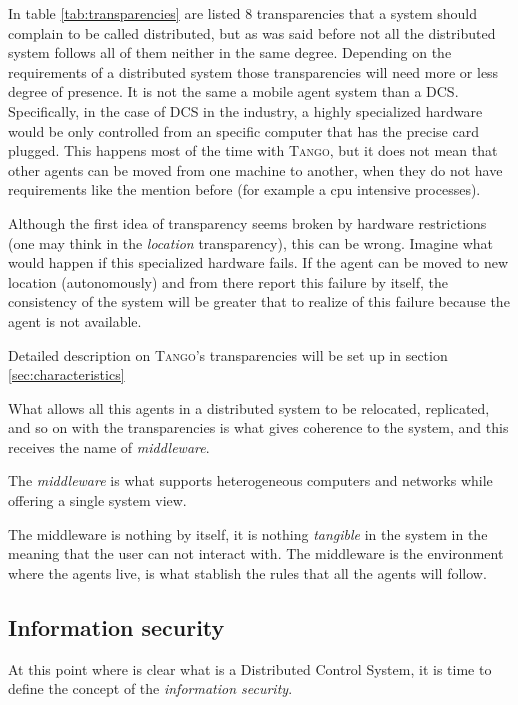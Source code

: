 \documentclass[10pt,a4paper,twoside]{llncs}
\newcommand{\tango}{\textsc{Tango}}
\begin{document}
In table \ref{tab:transparencies} are listed 8 transparencies that a system should complain to be called distributed, but as was said before not all the distributed system follows all of them neither in the same degree. Depending on the requirements of a distributed system those transparencies will need more or less degree of presence. It is not the same a mobile agent system than a DCS. Specifically, in the case of DCS in the industry, a highly specialized hardware would be only controlled from an specific computer that has the precise card plugged. This happens most of the time with \tango, but it does not mean that other agents can be moved from one machine to another, when they do not have requirements like the mention before (for example a cpu intensive processes).

Although the first idea of transparency seems broken by hardware restrictions (one may think in the \emph{location} transparency), this can be wrong. Imagine what would happen if this specialized hardware fails. If the agent can be moved to new location (autonomously) and from there report this failure by itself, the consistency of the system will be greater that to realize of this failure because the agent is not available.

Detailed description on \tango's transparencies will be set up in section \ref{sec:characteristics}

What allows all this agents in a distributed system to be relocated, replicated, and so on with the transparencies is what gives coherence to the system, and this receives the name of \emph{middleware}.

\begin{definition}\label{def:middleware}
    The \emph{middleware} is what supports heterogeneous computers and networks while offering a single system view.
\end{definition}

The middleware is nothing by itself, it is nothing \emph{tangible} in the system in the meaning that the user can not interact with. The middleware is the environment where the agents live, is what stablish the rules that all the agents will follow.

\subsection{Information security}\label{sec:InfoSec}

At this point where is clear what is a Distributed Control System, it is time to define the concept of the \emph{information security}. 
\end{document}
